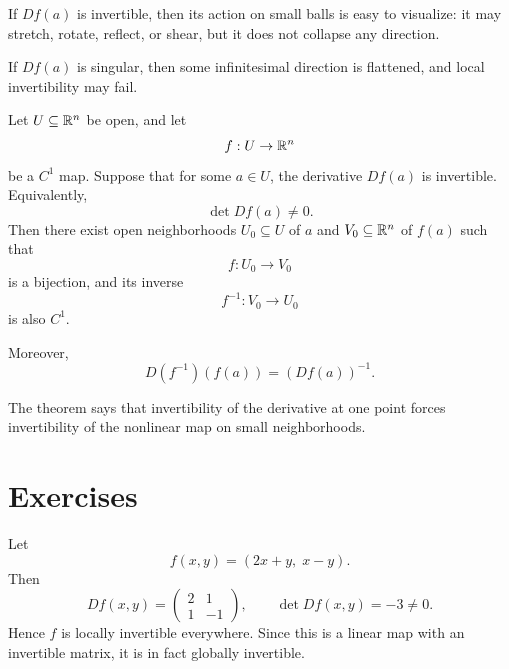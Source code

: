 If \(Df(a)\) is invertible, then its action on small balls is easy to visualize: it may stretch, rotate, reflect, or shear, but it does not collapse any direction.

If \(Df(a)\) is singular, then some infinitesimal direction is flattened, and local invertibility may fail.
\begin{theorem}
Let \(U\subseteq \mathbb{R}^n\) be open, and let
\[
f:U\to\mathbb{R}^n
\]
be a \(C^1\) map. Suppose that for some \(a\in U\), the derivative \(Df(a)\) is invertible. Equivalently,
\[
\det Df(a)\neq 0.
\]
Then there exist open neighborhoods \(U_0\subseteq U\) of \(a\) and \(V_0\subseteq \mathbb{R}^n\) of \(f(a)\) such that
\[
f:U_0\to V_0
\]
is a bijection, and its inverse
\[
f^{-1}:V_0\to U_0
\]
is also \(C^1\).

Moreover,
\[
D(f^{-1})(f(a))=(Df(a))^{-1}.
\]
\end{theorem}
The theorem says that invertibility of the derivative at one point forces invertibility of the nonlinear map on small neighborhoods.
\section*{Exercises}
\begin{example}
Let
\[
f(x,y)=(2x+y,\;x-y).
\]
Then
\[
Df(x,y)=
\begin{pmatrix}
2 & 1\\
1 & -1
\end{pmatrix},
\qquad
\det Df(x,y)=-3\neq 0.
\]
Hence \(f\) is locally invertible everywhere. Since this is a linear map with an invertible matrix, it is in fact globally invertible.
\end{example}

